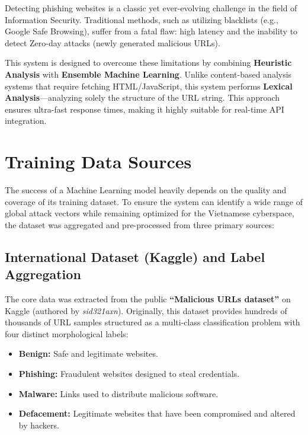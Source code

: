 \documentclass[12pt,a4paper]{article}
\begin{document}
Detecting phishing websites is a classic yet ever-evolving challenge in the field of Information Security. Traditional methods, such as utilizing blacklists (e.g., Google Safe Browsing), suffer from a fatal flaw: high latency and the inability to detect Zero-day attacks (newly generated malicious URLs).

This system is designed to overcome these limitations by combining \textbf{Heuristic Analysis} with \textbf{Ensemble Machine Learning}. Unlike content-based analysis systems that require fetching HTML/JavaScript, this system performs \textbf{Lexical Analysis}---analyzing solely the structure of the URL string. This approach ensures ultra-fast response times, making it highly suitable for real-time API integration.

\section{Training Data Sources}

The success of a Machine Learning model heavily depends on the quality and coverage of its training dataset. To ensure the system can identify a wide range of global attack vectors while remaining optimized for the Vietnamese cyberspace, the dataset was aggregated and pre-processed from three primary sources:

\subsection{International Dataset (Kaggle) and Label Aggregation}
The core data was extracted from the public \textbf{``Malicious URLs dataset''} on Kaggle (authored by \textit{sid321axn}). Originally, this dataset provides hundreds of thousands of URL samples structured as a multi-class classification problem with four distinct morphological labels:
\begin{itemize}
    \item \textbf{Benign:} Safe and legitimate websites.
    \item \textbf{Phishing:} Fraudulent websites designed to steal credentials.
    \item \textbf{Malware:} Links used to distribute malicious software.
    \item \textbf{Defacement:} Legitimate websites that have been compromised and altered by hackers.
\end{itemize}
\end{document}
